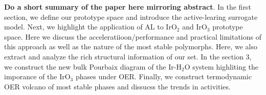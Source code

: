 {\bf Do a short summary of the paper here mirroring abstract}. In the first section, we define our prototype space and introduce the active-learing surrogate model. Next, we highlight the application of AL to  IrO$_2$ and  IrO$_3$ prototype space. Here we discuss the acceleratiioon/performance and practical limitations of this approach as well as the nature of the most stable polymorphs. Here, we also extract and analyze the rich structural information of our set. In the section 3, we construct the new bulk Pourbaix diagram of the Ir-H$_2$O system highliting the imporance of the IrO$_3$ phases under OER. Finally, we construct termodynamic OER volcano of most stable phases and dissucss the trends in activities.         










